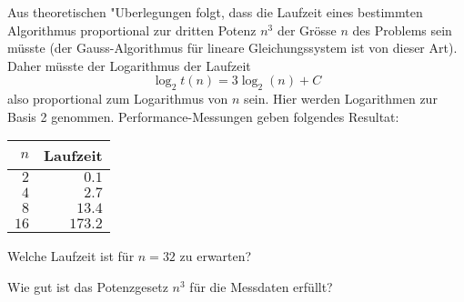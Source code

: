 Aus theoretischen "Uberlegungen folgt, dass die Laufzeit eines bestimmten
Algorithmus proportional zur dritten Potenz $n^3$ der
Grösse $n$ des Problems sein müsste (der Gauss-Algorithmus
für lineare Gleichungssystem ist von dieser Art). Daher müsste
der Logarithmus der Laufzeit 
\[
\log_2 t(n)=3\log_2(n) +C
\]
also proportional zum Logarithmus von $n$ sein.
Hier werden Logarithmen zur Basis 2 genommen.
Performance-Messungen geben folgendes Resultat:
\begin{center}
\begin{tabular}{|r|r|}
\hline
$n$&Laufzeit\\
\hline
$ 2$&$  0.1$\\
$ 4$&$  2.7$\\
$ 8$&$ 13.4$\\
$16$&$173.2$\\
\hline
\end{tabular}
\end{center}
\begin{teilaufgaben}
\item Welche Laufzeit ist für $n=32$ zu erwarten?
\item Wie gut ist das Potenzgesetz $n^3$ für die Messdaten erfüllt?
\end{teilaufgaben}



